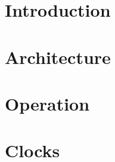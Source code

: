 \documentclass{gqtekspec}
\begin{document}
\chapter{Introduction}\label{ch:intro}
\setcounter{page}{1}

%
%
%



\chapter{Architecture}\label{ch:arch}


\chapter{Operation}\label{ch:ops}

%

\chapter{Clocks}\label{ch:clocks}


\end{document}
